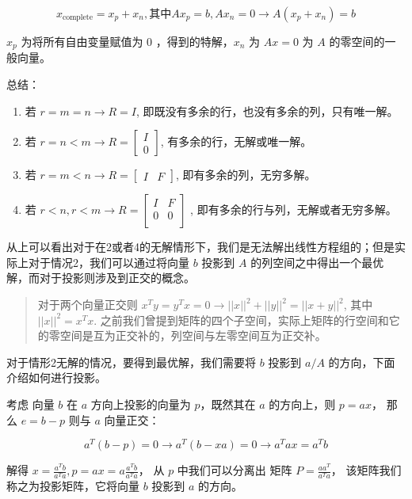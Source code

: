 \documentclass[
  letterpaper,
  DIV=11,
  numbers=noendperiod]{scrartcl}
\providecommand{\tightlist}{%
  \setlength{\itemsep}{0pt}\setlength{\parskip}{0pt}}\usepackage{longtable,booktabs,array}
\begin{document}
\[
x_\text{complete} = x_p + x_n, \text{其中} Ax_p = b, Ax_n = 0 \rightarrow A(x_p + x_n) = b
\]

\(x_p\) 为将所有自由变量赋值为 0 ，得到的特解，\(x_n\) 为 \(Ax = 0\) 为
\(A\) 的零空间的一般向量。

总结：

\begin{enumerate}
\def\labelenumi{\arabic{enumi}.}
\tightlist
\item
  若 \(r = m = n \rightarrow R = I\),
  即既没有多余的行，也没有多余的列，只有唯一解。
\item
  若 \(r = n < m \rightarrow R = \begin{bmatrix} I \\ 0 \end{bmatrix}\),
  有多余的行，无解或唯一解。
\item
  若 \(r = m < n \rightarrow R = \begin{bmatrix} I & F \end{bmatrix}\),
  即有多余的列，无穷多解。
\item
  若
  \(r < n, r < m \rightarrow R = \begin{bmatrix} I & F \\0 & 0 \\\end{bmatrix}\)
  , 即有多余的行与列，无解或者无穷多解。
\end{enumerate}

从上可以看出对于在2或者4的无解情形下，我们是无法解出线性方程组的；但是实际上对于情况2，我们可以通过将向量
\(b\) 投影到 \(A\)
的列空间之中得出一个最优解，而对于投影则涉及到正交的概念。

\begin{quote}
对于两个向量正交则
\(x^Ty = y^Tx = 0 \rightarrow ||x||^2 + ||y||^2 = ||x+y||^2\), 其中
\(||x||^2 = x^Tx\).
之前我们曾提到矩阵的四个子空间，实际上矩阵的行空间和它的零空间是互为正交补的，列空间与左零空间互为正交补。
\end{quote}

对于情形2无解的情况，要得到最优解，我们需要将 \(b\) 投影到 \(a/A\)
的方向，下面介绍如何进行投影。

考虑 向量 \(b\) 在 \(a\) 方向上投影的向量为 \(p\)，既然其在 \(a\)
的方向上，则 \(p = ax\)， 那么 \(e = b - p\) 则与 \(a\) 向量正交：

\[
a^T(b-p) = 0 \rightarrow a^T(b-xa) = 0 \rightarrow a^Tax = a^Tb
\]

解得 \(x = \frac{a^Tb}{a^Ta}, p = ax = a\frac{a^Tb}{a^Ta}\)， 从 \(p\)
中我们可以分离出 矩阵 \(P = \frac{aa^T}{a^Ta}\)，
该矩阵我们称之为投影矩阵，它将向量 \(b\) 投影到 \(a\) 的方向。
\end{document}
